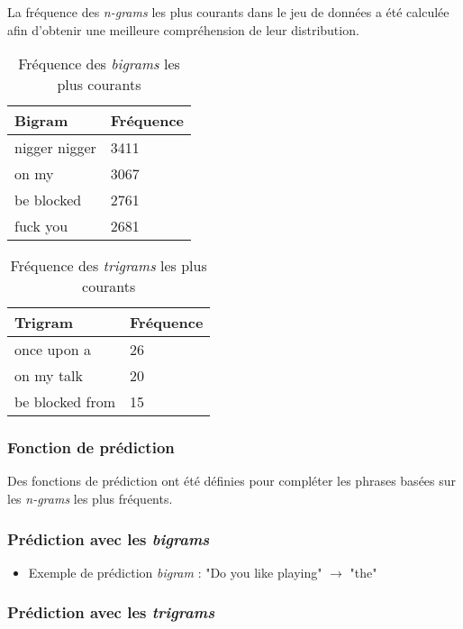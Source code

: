 La fréquence des \textit{n-grams} les plus courants dans le jeu de données a été calculée afin d'obtenir une meilleure compréhension de leur distribution.

\begin{table}[h]
    \centering
    \begin{tabular}{|l|l|}
    \hline
    \textbf{Bigram} & \textbf{Fréquence} \\ \hline
    nigger nigger & 3411 \\ \hline
    on my & 3067 \\ \hline
    be blocked & 2761 \\ \hline
    fuck you & 2681 \\ \hline
    \end{tabular}
    \caption{Fréquence des \textit{bigrams} les plus courants}
\end{table}

\begin{table}[h]
    \centering
    \begin{tabular}{|l|l|}
    \hline
    \textbf{Trigram} & \textbf{Fréquence} \\ \hline
    once upon a & 26 \\ \hline
    on my talk & 20 \\ \hline
    be blocked from & 15 \\ \hline
    \end{tabular}
    \caption{Fréquence des \textit{trigrams} les plus courants}
\end{table}

\subsubsection{Fonction de prédiction}

Des fonctions de prédiction ont été définies pour compléter les phrases basées sur les \textit{n-grams} les plus fréquents.

\subsubsection*{Prédiction avec les \textit{bigrams}}

\begin{itemize}
    \item Exemple de prédiction \textit{bigram} : "Do you like playing" $\rightarrow$ "the"
\end{itemize}

\subsubsection*{Prédiction avec les \textit{trigrams}}

